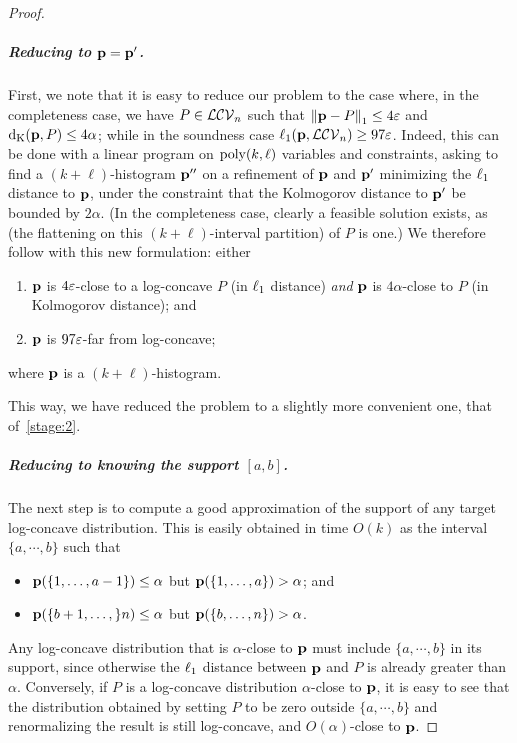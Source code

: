 \begin{proof}
\subparagraph{Reducing to $\D=\D^\prime$.}
First, we note that it is easy to reduce our problem to the case where, in the completeness case, we have $P\in\classlogconcave$ such that $\normone{\D-P} \leq 4\eps$  and $\kolmogorov{\D}{P} \leq 4\alpha$; while in the soundness case $\lp[1](\D,\classlogconcave) \geq 97\eps$. Indeed, this can be done with a linear program on $\poly(k,\ell)$ variables and constraints, asking to find a $(k+\ell)$-histogram $\D^{\prime\prime}$ on a refinement of $\D$ and $\D^\prime$ minimizing the $\lp[1]$ distance to $\D$, under the constraint that the Kolmogorov distance to $\D^\prime$ be bounded by $2\alpha$. (In the completeness case, clearly a feasible solution exists, as (the flattening on this $(k+\ell)$-interval partition) of $P$ is one.) We therefore follow with this new formulation: either
  \begin{enumerate}[\sf(a)]
    \item $\D$ is $4\eps$-close to a log-concave $P$ (in $\lp[1]$ distance) \emph{and} $\D$ is $4\alpha$-close to $P$ (in Kolmogorov distance); and
    \item $\D$ is $97\eps$-far from log-concave;
  \end{enumerate} 
where $\D$ is a $(k+\ell)$-histogram.\medskip

\noindent This way, we have reduced the problem to a slightly more convenient one, that of~\cref{stage:2}.

\subparagraph{Reducing to knowing the support $[a,b]$.}
The next step is to compute a good approximation of the support of any target log-concave distribution. This is easily obtained in time $O(k)$ as the interval $\{a,\cdots,b\}$ such that
\begin{itemize}
  \item $\D(\{1,\dots,a-1\}) \leq \alpha$ but $\D(\{1,\dots,a\}) > \alpha$; and
  \item $\D(\{b+1,\dots,\}n) \leq \alpha$ but $\D(\{b,\dots,n\}) > \alpha$.
\end{itemize} 
Any log-concave distribution that is $\alpha$-close to $\D$ must include  $\{a,\cdots,b\}$ in its support, since otherwise the $\lp[1]$ distance between $\D$ and $P$ is already greater than $\alpha$. Conversely, if $P$ is a log-concave distribution $\alpha$-close to $\D$, it is easy to see that the distribution obtained by setting $P$ to be zero outside $\{a,\cdots,b\}$ and renormalizing the result is still log-concave, and $O(\alpha)$-close to $\D$.


\end{proof}
